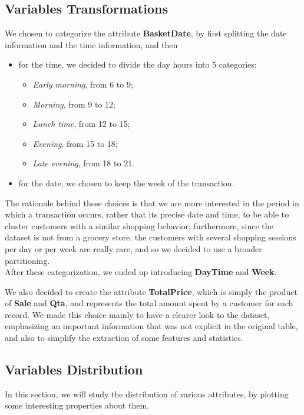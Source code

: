 \subsection{Variables Transformations}
We chosen to categorize the attribute \textbf{BasketDate}, by first splitting the date information and the time information, and then

\begin{itemize}
\item for the time, we decided to divide the day hours into 5 categories:
	\begin{itemize}
	\item \emph{Early morning}, from 6 to 9;
	\item \emph{Morning}, from 9 to 12;
	\item \emph{Lunch time}, from 12 to 15;
	\item \emph{Evening}, from 15 to 18;
	\item \emph{Late evening}, from 18 to 21.
	\end{itemize}
\item for the date, we chosen to keep the week of the transaction.
\end{itemize}

The rationale behind these choices is that we are more interested in the period in which a transaction occurs, rather that its precise date and time, to be able to cluster customers with a similar shopping behavior; furthermore, since the dataset is not from a grocery store, the customers with several shopping sessions per day or per week are really rare, and so we decided to use a broader partitioning.\\
After these categorization, we ended up introducing \textbf{DayTime} and \textbf{Week}.

We also decided to create the attribute \textbf{TotalPrice}, which is simply the product of \textbf{Sale} and \textbf{Qta}, and represents the total amount spent by a customer for each record. We made this choice mainly to have a clearer look to the dataset, emphasizing an important information that was not explicit in the original table, and also to simplify the extraction of some features and statistics.

\subsection{Variables Distribution}
In this section, we will study the distribution of various attributes, by plotting some interesting properties about them.

